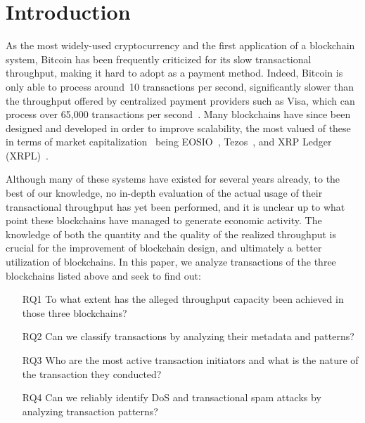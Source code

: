 
\section{Introduction}
\label{sec:introduction}

As the most widely-used cryptocurrency and the first application of a blockchain system, Bitcoin has been frequently criticized for its slow transactional throughput, making it hard to adopt as a payment method.
Indeed, Bitcoin is only able to process around~10 transactions per second, significantly slower than the throughput offered by centralized payment providers such as Visa, which can process over 65,000 transactions per second~\cite{visa-tps}.
Many blockchains have since been designed and developed in order to improve scalability, the most valued of these in terms of market capitalization~\cite{CoinMarketCap2020} being EOSIO~\cite{EOS}, Tezos~\cite{Goodman2014}, and XRP Ledger (XRPL)~\cite{xrp_ledger_overview}. 

Although many of these systems have existed for several years already, to the best of our knowledge, no in-depth evaluation of the actual usage of their transactional throughput has yet been performed, and it is unclear up to what point these blockchains have managed to generate economic activity.
The knowledge of both the quantity and the quality of the realized throughput is crucial for the improvement of blockchain design, and ultimately a better utilization of blockchains.
In this paper, we analyze transactions of the three blockchains listed above and seek to find out:

\begin{enumerate}
    \item[RQ1] To what extent has the alleged throughput capacity been achieved in those three blockchains?
    \item[RQ2] Can we classify transactions by analyzing their metadata and patterns?
    \item[RQ3] Who are the most active transaction initiators and what is the nature of the transaction they conducted?
    \item[RQ4] Can we reliably identify DoS and transactional spam attacks by analyzing transaction patterns?
\end{enumerate}


